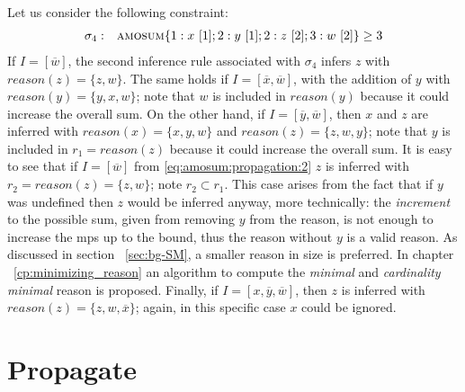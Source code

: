 \begin{example}\label{ex:amosum:propagation:more-2}
    Let us consider the following constraint:
    \begin{align*}
    \begin{array}{rl}
        \sigma_{4}: & \textsc{amosum}\{
            1 : x\ [1]; 2 : y\ [1]; 2 : z\ [2]; 3 : w\ [2]
        \} \geq 3
    \end{array}
    \end{align*}
    If $I = [\overline{w}]$, the second inference rule associated with $\sigma_4$ infers $z$ with $\mathit{reason}(z) = \{z, w\}$.
    The same holds if $I = [\overline{x}, \overline{w}]$, with the addition of $y$ with $\mathit{reason}(y) = \{y, x, w\}$;
    note that $w$ is included in $\mathit{reason}(y)$ because it could increase the overall sum.
    On the other hand, if $I = [\overline{y}, \overline{w}]$, then $x$ and $z$ are inferred with 
    $\mathit{reason}(x) = \{x, y, w\}$ and
    $\mathit{reason}(z) = \{z, w, y\}$;
    note that $y$ is included in $r_1 = \mathit{reason}(z)$ because it could increase the overall sum. 
    It is easy to see that if $I = [\overline{w}]$
    from \eqref{eq:amosum:propagation:2} $z$ is inferred with $r_2 = \mathit{reason}(z) = \{z, w\}$;
    note $r_2 \subset r_1$. This case arises from the fact that if $y$ was undefined then 
    $z$ would be inferred anyway, more technically: the \textit{increment} to the possible 
    sum, given from removing $y$ from the reason, is not enough to increase the mps up to the bound, thus 
    the reason without $y$ is a valid reason.
    As discussed in section ~\ref{sec:bg-SM}, a smaller reason in size is preferred.
    In chapter ~\ref{cp:minimizing_reason} an algorithm to compute the \textit{minimal} and 
    \textit{cardinality minimal} reason is proposed.
    Finally, if $I = [x, \overline{y}, \overline{w}]$, then $z$ is inferred with $\mathit{reason}(z) = \{z, w, \overline{x}\}$;
    again, in this specific case $x$ could be ignored.
    \end{example}
    

\section{Propagate}
\label{sec:amo:propagator}

